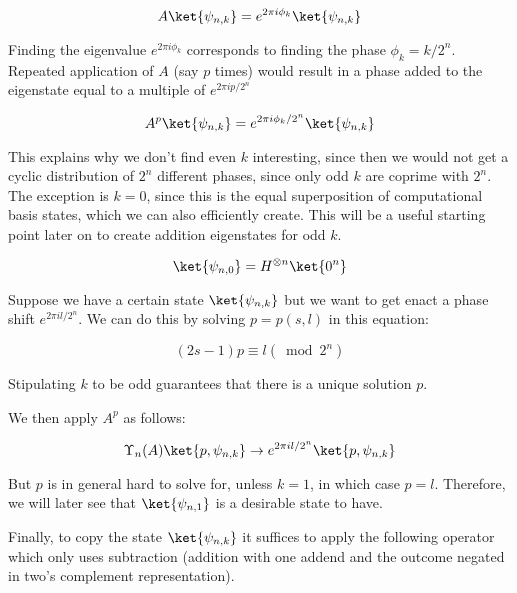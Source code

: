 \begin{equation}
A\ket{\psi_{n,k}} = e^{2\pi i \phi_k} \ket{\psi_{n,k}}
\end{equation}

Finding the eigenvalue $e^{2\pi i \phi_k}$ corresponds to finding
the phase $\phi_k = k / 2^n$.
Repeated application of $A$ (say $p$ times) would result in a phase
added to the eigenstate equal to a multiple of $e^{2\pi i p / 2^n}$

\begin{equation}
A^p\ket{\psi_{n,k}} = e^{2\pi i \phi_k / 2^n} \ket{\psi_{n,k}}
\end{equation}

This explains why we don't find even $k$ interesting,
since then we would not get a
cyclic distribution of $2^n$ different phases,
since only odd $k$
are coprime with $2^n$. The exception is $k=0$, since this is the
equal superposition of computational basis states, which we can also
efficiently create. This will be a useful starting point later on to
create addition eigenstates
for odd $k$.

\begin{displaymath}
\ket{\psi_{n,0}} = H^{\otimes n}\ket{0^n}
\end{displaymath}

Suppose we have a certain state $\ket{\psi_{n,k}}$ but we want to get enact
a phase shift $e^{2\pi i l / 2^n}$. We can do this by solving $p=p(s,l)$
in this equation:

\begin{equation}
\label{eqn:psl}
(2s-1)p \equiv l (\bmod 2^n)
\end{equation}

Stipulating $k$ to be odd guarantees that there is a unique solution $p$.

We then apply $A^p$ as follows:

\begin{equation}
\label{eqn:upsilon}
\Upsilon_n(A) \ket{p, \psi_{n,k}} \rightarrow
e^{2\pi i l/2^n} \ket{p, \psi_{n,k}}
\end{equation}

But $p$ is in general hard to solve for, unless $k=1$, in which case
$p = l$. Therefore, we will later see that $\ket{\psi_{n,1}}$ is a desirable
state to have.

Finally, to copy the state $\ket{\psi_{n,k}}$ it suffices to apply the following
operator which only uses subtraction (addition with one addend and the
outcome negated in two's complement representation).

